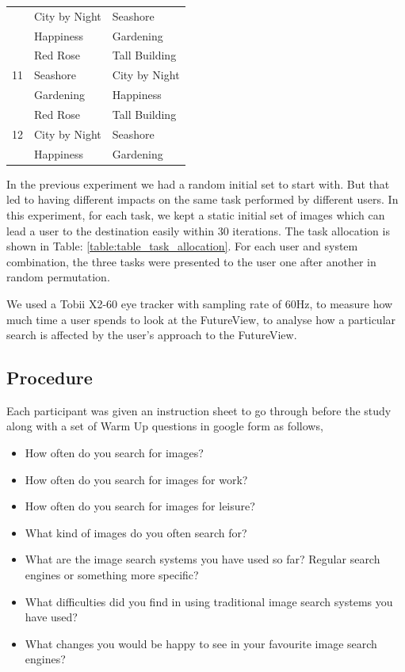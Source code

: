 \documentclass[english]{tktltiki}
\begin{document}
\begin{center}
\begin{tabular}{ |l|l|l| }
 			& City by Night & Seashore \\
 			& Happiness & Gardening \\
 		\hline
 		\multirow{3}{*}{11} & Red Rose & Tall Building \\
 			& Seashore & City by Night \\
 			& Gardening & Happiness \\
 		\hline
 		\multirow{3}{*}{12} & Red Rose & Tall Building \\
 			& City by Night & Seashore \\
 			& Happiness & Gardening \\
 		\hline
	\end{tabular}
    \label{table:table_task_allocation}
\end{center}

In the previous experiment we had a random initial set to start with. But that led to having different impacts on the same task performed by different users. In this experiment, for each task, we kept a static initial set of images which can lead a user to the destination easily within $30$ iterations. The task allocation is shown in Table: \ref{table:table_task_allocation}. For each user and system combination, the three tasks were presented to the user one after another in random permutation.

We used a Tobii X2-60 eye tracker with sampling rate of 60Hz, to measure how much time a user spends to look at the FutureView, to analyse how a particular search is affected by the user's approach to the FutureView.


\subsection{Procedure}


Each participant was given an instruction sheet to go through before the study along with a set of Warm Up questions in google form as follows,

\begin{itemize}
	\item How often do you search for images?
	\item How often do you search for images for work?
	\item How often do you search for images for leisure?
	\item What kind of images do you often search for?
	\item What are the image search systems you have used so far? Regular search engines or something more specific?
	\item What difficulties did you find in using traditional image search systems you have used?
	\item What changes you would be happy to see in your favourite image search engines?
\end{itemize}
\end{document}
